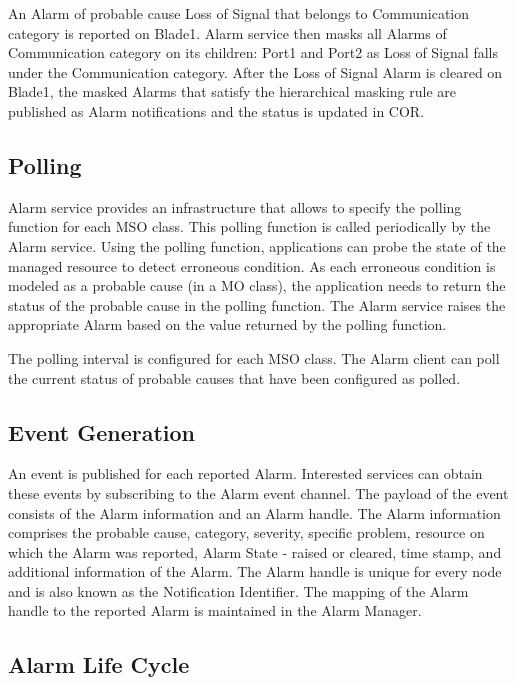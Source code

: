 \newpage
\begin{flushleft}

An Alarm of probable cause Loss of Signal that belongs to Communication category is reported on Blade1. Alarm service then masks all Alarms of 
Communication category on its children: Port1 and Port2 as Loss of Signal falls under the Communication category. After the Loss of Signal Alarm is
cleared on Blade1, the masked Alarms that satisfy the hierarchical masking rule are published as Alarm notifications and the status is updated in COR.

\subsection{Polling}

Alarm service provides an infrastructure that allows to specify the polling function for each MSO class. This polling function is called periodically by the 
Alarm service. Using the polling function, applications can probe the state of the managed resource to detect erroneous condition. As each erroneous 
condition is modeled as a probable cause (in a MO class), the application needs to return the status of the probable cause in the polling function. The 
Alarm service raises the appropriate Alarm based on the value returned by the polling function. 
\par
The polling interval is configured for each MSO class. The Alarm client can poll the current status of probable causes that have been configured as 
polled.


\subsection{Event Generation}

An event is published for each reported Alarm. Interested services can obtain these events by subscribing to the Alarm event channel. The payload of the
event consists of the Alarm information and an Alarm handle. The Alarm information comprises the probable cause, category, severity, specific problem, 
resource on which the Alarm was reported, Alarm State - raised or cleared, time stamp, and additional information of the Alarm. The Alarm handle is 
unique for every node and is also known as the Notification Identifier. The mapping of the Alarm handle to the reported Alarm is maintained in the Alarm 
Manager.

\subsection{Alarm Life Cycle}

\end{flushleft}
